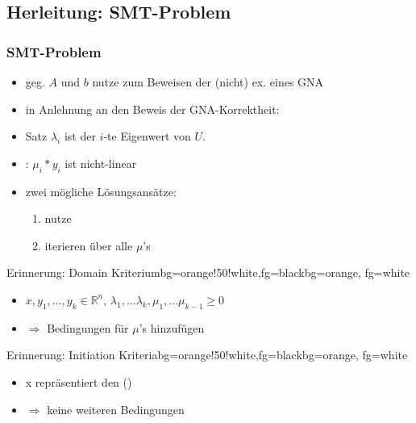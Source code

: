 \subsection{Herleitung: SMT-Problem}
\begin{frame}
	\frametitle{SMT-Problem}
	\begin{itemize}
		\item geg. $A$ und $b$ nutze \solver zum Beweisen der (nicht) ex. eines GNA
		\item in Anlehnung an den Beweis der GNA-Korrektheit:
		\item[]	\begin{block}{Satz}
					$\lambda_i$ ist der $i$-te Eigenwert von $U$.
				\end{block}
		\item {}: $\mu_i*y_i$ ist nicht-linear
		\item[] zwei m\"ogliche L\"osungsans\"atze:
			\begin{enumerate}
				\item nutze \qfnia
				\item iterieren \"uber alle $\mu$'s
			\end{enumerate}
	\end{itemize}
\end{frame}

\begin{frame}
	\begin{variableblock}{Erinnerung: Domain Kriterium}{bg=orange!50!white,fg=black}{bg=orange, fg=white}
		\begin{itemize}
			\setlength{\itemindent}{1cm}
			\item[(domain)] $x, y_1, \dots, y_k \in \mathbb{R}^n$, $\lambda_1, \dots \lambda_k, \mu_1, \dots \mu_{k-1} \ge 0$
		\end{itemize}
	\end{variableblock}
	\begin{itemize}
		\item[] $\Rightarrow$ Bedingungen f\"ur  $\mu$'s hinzufügen
	\end{itemize}
	\begin{variableblock}{Erinnerung: Initiation Kriteria}{bg=orange!50!white,fg=black}{bg=orange, fg=white}
		\begin{itemize}
			\setlength{\itemindent}{1cm}
			\item[(init)] x repr\"asentiert den \startterm (\stem)
		\end{itemize}
	\end{variableblock}
	\begin{itemize}
		\item[] $\Rightarrow$ keine weiteren Bedingungen
	\end{itemize}
	
\end{frame}

